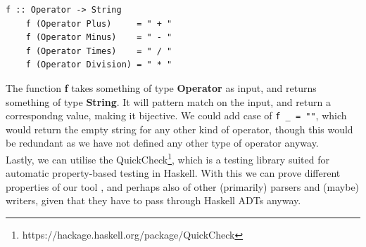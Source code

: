 \begin{lstlisting}[caption={Haskell example to convert data type to string}, captionpos=b]
    f :: Operator -> String
    f (Operator Plus)     = " + "
    f (Operator Minus)    = " - "
    f (Operator Times)    = " / "
    f (Operator Division) = " * "
\end{lstlisting}

The function \textbf{f} takes something of type \textbf{Operator} as input, and returns something of type \textbf{String}. It will pattern match on the input, and return a correspondng value, making it bijective. We could add case of \texttt{f \_ = ""}, which would return the empty string for any other kind of operator, though this would be redundant as we have not defined any other type of operator anyway. \hfill \\

Lastly, we can utilise the QuickCheck\footnote{https://hackage.haskell.org/package/QuickCheck}, which is a testing library suited for automatic property-based testing in Haskell. With this we can prove different properties of our tool \cite{DBLP:conf/icfp/ClaessenH00}, and perhaps also of other (primarily) parsers and (maybe) writers, given that they have to pass through Haskell ADTs anyway.